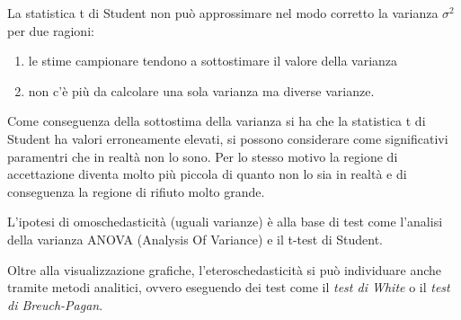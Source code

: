 \documentclass[]{article}
\begin{document}
La statistica t di Student non può approssimare nel modo corretto la varianza $\sigma^2$ per due ragioni:
\begin{enumerate}
\item le stime campionare tendono a sottostimare il valore della varianza
\item non c'è più da calcolare una sola varianza ma diverse varianze.
\end{enumerate}

Come conseguenza della sottostima della varianza si ha che la statistica t di Student ha valori erroneamente elevati, si possono considerare come significativi paramentri che in realtà non lo sono. Per lo stesso motivo la regione di accettazione diventa molto più piccola di quanto non lo sia in realtà e di conseguenza la regione di rifiuto molto grande.

L'ipotesi di omoschedasticità (uguali varianze) è alla base di test come l'analisi della varianza ANOVA (Analysis Of Variance) e il t-test di Student.

Oltre alla visualizzazione grafiche, l'eteroschedasticità si può individuare anche tramite metodi analitici, ovvero eseguendo dei test come il \textit{test di White} o il \textit{test di Breuch-Pagan}.
\end{document}
